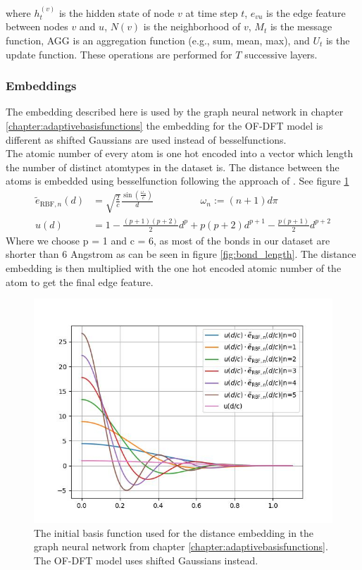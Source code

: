 where $h_t^{(v)}$ is the hidden state of node $v$ at time step $t$, $e_{vu}$ is the edge feature between nodes $v$ and $u$, $N(v)$ is the neighborhood of $v$, $M_t$ is the message function, AGG is an aggregation function (e.g., sum, mean, max), and $U_t$ is the update function. These operations are performed for $T$ successive layers.

\subsubsection{Embeddings}
The embedding described here is used by the graph neural network in chapter
\ref{chapter:adaptivebasisfunctions} the embedding for the OF-DFT model is different as shifted Gaussians are used instead of besselfunctions.\\
The atomic number of every atom is one hot encoded into a vector which length the number of distinct atomtypes in the dataset is.
The distance between the atoms is embedded using besselfunction following the approach of \cite{gasteiger_directional_2022}. See figure \ref{fig:bessel_embedding}
\begin{align}
    \tilde{e}_{\text{RBF},n}(d) &= \sqrt{\frac{2}{c}}\frac{\sin(\frac{\omega_n }{c})}{d}\hspace{2cm} \omega_n :=(n+1)d\pi\\
    u(d)&= 1-\frac{(p+1)(p+2)}{2}d^p + p(p+2)d^{p+1}-\frac{p(p+1)}{2}d^{p+2}
\end{align}
Where we choose p = 1 and c = 6, as most of the bonds in our dataset are shorter than 6 Angstrom as can be seen in figure \ref{fig:bond_length}. The distance embedding is then multiplied with the one hot encoded atomic number of the atom to get the final edge feature.
\begin{figure}
    \centering
    \includegraphics[width=1.\textwidth]{chapters/foundations/images_foundation/bessel_embedding}
    \caption{The initial basis function used for the distance embedding in the graph neural network from chapter
\ref{chapter:adaptivebasisfunctions}. The OF-DFT model uses shifted Gaussians instead.}
    \label{fig:bessel_embedding}
\end{figure}
